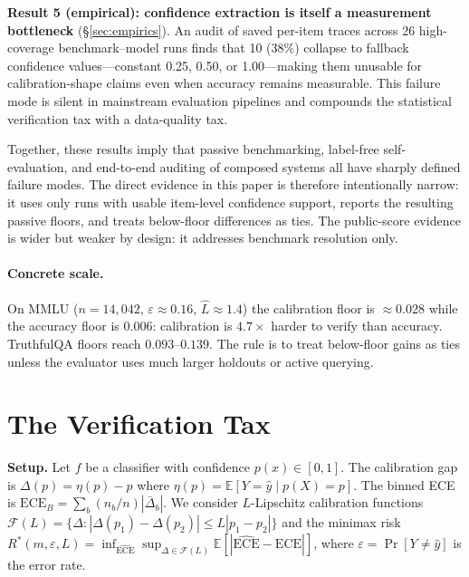 \documentclass{article}
\newcommand{\ECE}{\mathrm{ECE}}
\newcommand{\cF}{\mathcal{F}}
\newcommand{\Lip}{L}
\newcommand{\errrate}{\varepsilon}
\newcommand{\nsamples}{m}
\newcommand{\calmapraw}{\eta}
\newcommand{\calmap}{\Delta}
\providecommand{\E}{}
\renewcommand{\E}{\mathbb{E}}
\theoremstyle{definition}
\begin{document}
\textbf{Result 5 (empirical): confidence extraction is itself a measurement bottleneck} (\S\ref{sec:empirics}). An audit of saved per-item traces across 26 high-coverage benchmark--model runs finds that 10 (38\%) collapse to fallback confidence values---constant 0.25, 0.50, or 1.00---making them unusable for calibration-shape claims even when accuracy remains measurable. This failure mode is silent in mainstream evaluation pipelines and compounds the statistical verification tax with a data-quality tax.

Together, these results imply that passive benchmarking, label-free self-evaluation, and end-to-end auditing of composed systems all have sharply defined failure modes. The direct evidence in this paper is therefore intentionally narrow: it uses only runs with usable item-level confidence support, reports the resulting passive floors, and treats below-floor differences as ties. The public-score evidence is wider but weaker by design: it addresses benchmark resolution only.

\paragraph{Concrete scale.} On MMLU ($n{=}14{,}042$, $\errrate{\approx}0.16$, $\hat\Lip{\approx}1.4$) the calibration floor is $\approx 0.028$ while the accuracy floor is $0.006$: calibration is $4.7\times$ harder to verify than accuracy. TruthfulQA floors reach $0.093$--$0.139$. The rule is to treat below-floor gains as ties unless the evaluator uses much larger holdouts or active querying.

\section{The Verification Tax}
\label{sec:theory}

\textbf{Setup.} Let $f$ be a classifier with confidence $p(x) \in [0,1]$. The calibration gap is $\calmap(p) = \calmapraw(p) - p$ where $\calmapraw(p) = \E[Y{=}\hat{y} \mid p(X){=}p]$. The binned ECE is $\ECE_B = \sum_b (n_b/n)|\bar{\calmap}_b|$. We consider $\Lip$-Lipschitz calibration functions $\cF(\Lip) = \{\calmap : |\calmap(p_1) - \calmap(p_2)| \leq \Lip|p_1-p_2|\}$ and the minimax risk $R^*(\nsamples,\errrate,\Lip) = \inf_{\widehat{\ECE}} \sup_{\calmap \in \cF(\Lip)} \E[|\widehat{\ECE} - \ECE|]$, where $\errrate = \Pr[Y \neq \hat{y}]$ is the error rate.
\end{document}

